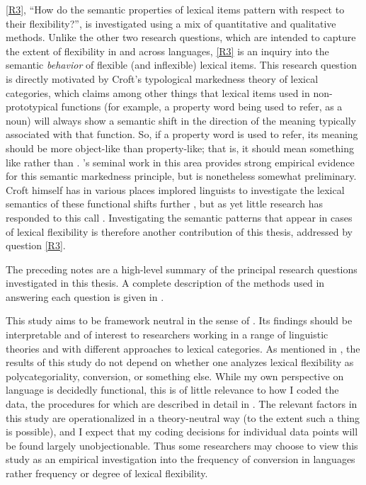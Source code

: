 \ref{R3}, \enquote{How do the semantic properties of lexical items pattern with respect to their flexibility?}, is investigated using a mix of quantitative and qualitative methods. Unlike the other two research questions, which are intended to capture the extent of flexibility in and across languages, \ref{R3} is an inquiry into the semantic \emph{behavior} of flexible (and inflexible) lexical items. This research question is directly motivated by Croft's \parencites*{Croft1991}{Croft2000}{Croft2001b}{Croftfc} typological markedness theory of lexical categories, which claims among other things that lexical items used in non-prototypical functions (for example, a property word being used to refer, as a noun) will always show a semantic shift in the direction of the meaning typically associated with that function. So, if a property word is used to refer, its meaning should be more object-like than property-like; that is, it should mean something like  rather than . \citeauthor{Croft1991}'s \parencite*{Croft1991} seminal work in this area provides strong empirical evidence for this semantic markedness principle, but is nonetheless somewhat preliminary. Croft himself has in various places implored linguists to investigate the lexical semantics of these functional shifts further \parencites[440]{Croft2005}[70]{CroftLier2012}, but as yet little research has responded to this call . Investigating the semantic patterns that appear in cases of lexical flexibility is therefore another contribution of this thesis, addressed by question \ref{R3}.

The preceding notes are a high-level summary of the principal research questions investigated in this thesis. A complete description of the methods used in answering each question is given in .

This study aims to be framework neutral in the sense of \textcite{Haspelmath2010b}. Its findings should be interpretable and of interest to researchers working in a range of linguistic theories and with different approaches to lexical categories. As mentioned in , the results of this study do not depend on whether one analyzes lexical flexibility as polycategoriality, conversion, or something else. While my own perspective on language is decidedly functional, this is of little relevance to how I coded the data, the procedures for which are described in detail in . The relevant factors in this study are operationalized in a theory-neutral way (to the extent such a thing is possible), and I expect that my coding decisions for individual data points will be found largely unobjectionable. Thus some researchers may choose to view this study as an empirical investigation into the frequency of conversion in languages rather frequency or degree of lexical flexibility.

